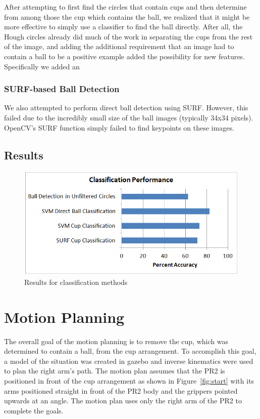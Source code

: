 \documentclass[letterpaper, 10 pt, conference]{ieeeconf}  %
\begin{document}
After attempting to first find the circles that contain cups and then determine from among those the cup which contains the ball, we realized that it might be more effective to simply use a classifier to find the ball directly. After all, the Hough circles already did much of the work in separating the cups from the rest of the image, and adding the additional requirement that an image had to contain a ball to be a positive example added the possibility for new features.  Specifically we added an 

\subsubsection{SURF-based Ball Detection}

We also attempted to perform direct ball detection using SURF.  However, this failed due to the incredibly small size of the ball images (typically 34x34 pixels).  OpenCV's SURF function simply failed to find keypoints on these images.

\subsection{Results}



\begin{figure}[thpb]
      \centering
	  \includegraphics[scale =0.45]{performance}
      \caption{Results for classification methods}
      \label{fig:results}
\end{figure}



\section{Motion Planning}

The overall goal of the motion planning is to remove the cup, which was determined to contain a ball, from the cup arrangement. To accomplish this goal,  a model of the situation was created in gazebo and inverse kinematics were used to plan the right arm's path. The motion plan assumes that the PR2 is positioned in front of the cup arrangement as shown in Figure~\ref{fig:start} with its arms positioned straight in front of the PR2 body and the grippers pointed upwards at an angle. The motion plan uses only the right arm of the PR2 to complete the goals.
\end{document}
